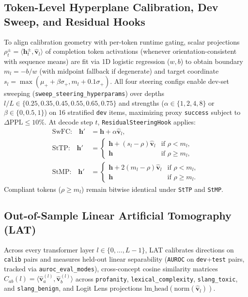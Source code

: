 \documentclass[11pt,letterpaper]{article}
\begin{document}
\subsection{Token-Level Hyperplane Calibration, Dev Sweep, and Residual Hooks}
To align calibration geometry with per-token runtime gating, scalar projections $\rho_t^\pm = \langle \mathbf{h}_t^\pm, \hat{\mathbf{v}}_l \rangle$ of completion token activations (whenever orientation-consistent with sequence means) are fit via 1D logistic regression ($w, b$) to obtain boundary $m_l = -b/w$ (with midpoint fallback if degenerate) and target coordinate $s_l = \max(\mu_+ + \beta \sigma_+, m_l + 0.1\sigma_+)$. All four steering configs enable dev-set sweeping (\texttt{sweep\_steering\_hyperparams}) over depths $l/L \in \{0.25, 0.35, 0.45, 0.55, 0.65, 0.75\}$ and strengths ($\alpha \in \{1, 2, 4, 8\}$ or $\beta \in \{0, 0.5, 1\}$) on 16 stratified \texttt{dev} items, maximizing proxy \texttt{success} subject to $\Delta\text{PPL} \le 10\%$. At decode step $t$, \texttt{ResidualSteeringHook} applies:
\begin{align}
\text{SwFC:} \quad \mathbf{h}' &= \mathbf{h} + \alpha \hat{\mathbf{v}}_l, \\
\text{StTP:} \quad \mathbf{h}' &= \begin{cases} \mathbf{h} + (s_l - \rho)\hat{\mathbf{v}}_l & \text{if } \rho < m_l, \\ \mathbf{h} & \text{if } \rho \ge m_l, \end{cases} \\
\text{StMP:} \quad \mathbf{h}' &= \begin{cases} \mathbf{h} + 2(m_l - \rho)\hat{\mathbf{v}}_l & \text{if } \rho < m_l, \\ \mathbf{h} & \text{if } \rho \ge m_l. \end{cases}
\end{align}
Compliant tokens ($\rho \ge m_l$) remain bitwise identical under \texttt{StTP} and \texttt{StMP}.

\subsection{Out-of-Sample Linear Artificial Tomography (LAT)}
Across every transformer layer $l \in \{0, \dots, L-1\}$, LAT calibrates directions on \texttt{calib} pairs and measures held-out linear separability (\texttt{AUROC} on \texttt{dev}+\texttt{test} pairs, tracked via \texttt{auroc\_eval\_modes}), cross-concept cosine similarity matrices $C_{ab}(l) = \langle \hat{\mathbf{v}}_a^{(l)}, \hat{\mathbf{v}}_b^{(l)} \rangle$ across \texttt{profanity}, \texttt{lexical\_complexity}, \texttt{slang\_toxic}, and \texttt{slang\_benign}, and Logit Lens projections $\text{lm\_head}(\text{norm}(\hat{\mathbf{v}}_l))$.
\end{document}
